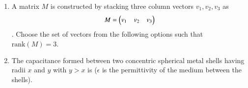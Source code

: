 \documentclass[journal,12pt,onecolumn]{IEEEtran}
\theoremstyle{remark}
\begin{document}
\begin{enumerate}
\item A matrix $M$ is constructed by stacking three column vectors $v_1, v_2, v_3$ as $$M = \myvec{v_1 & v_2 & v_3}$$. Choose the set of vectors from the following options such that $\text{rank}(M) = 3$.
\par\hfill{}
    \begin{enumerate}
    \end{enumerate}

\item The capacitance formed between two concentric spherical metal shells having radii $x$ and $y$ with $y>x$ is ($\epsilon$ is the permittivity of the medium between the shells).
\par\hfill{}
    \begin{enumerate}
    \end{enumerate}


\end{enumerate}
\end{document}
